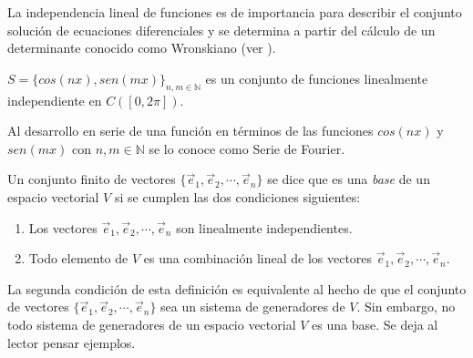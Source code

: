 \begin{remark}
La independencia lineal de funciones  es de importancia para describir el conjunto solución de ecuaciones diferenciales y se determina a partir del cálculo de un determinante conocido como Wronskiano  (ver \cite{grossman}).
\end{remark}


\begin{example}
$S=\{ cos(nx),sen(mx)\}_{n,m \in \mathbb{N}}$  es un conjunto de funciones linealmente independiente en $C(\left[0,2\pi\right])$.
\end{example}

\begin{remark}
Al desarrollo en serie de una función en   términos de las funciones $cos(nx)$ y $sen(mx)$ con $n,m \in \mathbb{N}$ se lo conoce como Serie de Fourier.
\end{remark}


\bigskip
\begin{definition}
\label{base}
Un conjunto finito de vectores $\{ \vec{e}_1,\vec{e}_2,\cdots, \vec{e}_n\}$ se dice que es una \textit{base} de un espacio vectorial $V$ si se cumplen las dos condiciones siguientes:
\begin{enumerate}

\item
Los vectores $ \vec{e}_1,\vec{e}_2,\cdots, \vec{e}_n$ son linealmente independientes.
\item
Todo elemento de $V$ es una combinación lineal de los vectores $ \vec{e}_1,\vec{e}_2,\cdots, \vec{e}_n$.

\end{enumerate}

\end{definition}

\bigskip

\begin{remark}

La segunda condición de esta definición es equivalente al hecho de que el conjunto de vectores $\{\vec{e}_1,\vec{e}_2,\cdots, \vec{e}_n \}$ sea un sistema de generadores de $V$. Sin embargo, no todo sistema de generadores de un espacio vectorial $V$ es una base. Se deja al lector pensar ejemplos.
\end{remark}




\bigskip


